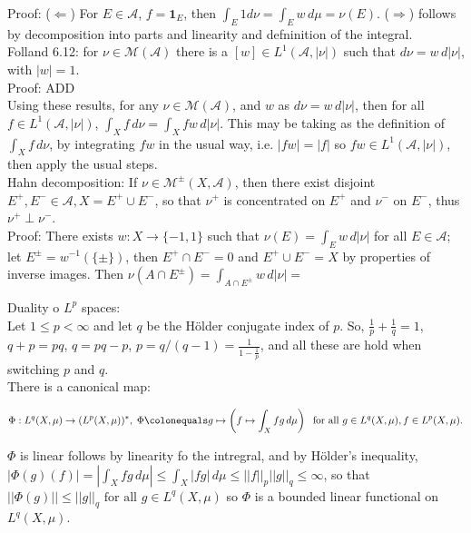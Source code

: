 \documentclass[12pt]{article}
\newcommand{\fall}[0] { \textrm{ for all } }
\newcommand{\A}[0] { \mathcal{A} }
\newcommand{\M}[0] { \mathcal{M} }
\newcommand{\rimply}[0] { \Rightarrow }
\newcommand{\limply}[0] { \Leftarrow }
\newcommand{\rarw}[0] { \rightarrow }
\newcommand{ \defeq }[0] { \colonequals }
\newcommand{ \cf }[1] { \mathbf{1}_{#1} }
\begin{document}
\noindent
Proof: ($\limply$) For $E \in \A$, $f = \cf{E}$, then $\int_E 1 d\nu = \int_E w \, d\mu = \nu(E)$. ($\rimply$) follows by decomposition into parts and linearity and defninition of the integral.   \\

Folland 6.12: for $\nu \in \M(\A)$ there is a $[w] \in L^1(\A, |\nu|)$ such that $d\nu = w \, d|\nu|$, with $|w| = 1$. \\

\noindent
Proof: ADD \\

Using these results, for any $\nu \in \M(\A)$, and $w$ as $d\nu = w \, d|\nu|$, then for all $f \in L^1(\A, |\nu|)$, $\int_X f \, d\nu = \int_X f w \, d|\nu|$. This may be taking as the definition of $\int_X f \, d\nu$, by integrating $f w$ in the usual way, i.e. $|fw| = |f|$ so $fw \in L^1(\A, |\nu|)$, then apply the usual steps. \\


Hahn decomposition: If $\nu \in \M^\pm(X, \A)$, then there exist disjoint $E^+, E^- \in \A, X = E^+ \cup E^-$, so that $\nu^+$ is concentrated on $E^+$ and $\nu^-$ on $E^-$, thus $\nu^+ \perp \nu^-$. \\

Proof: There exists $w: X \rarw \{-1, 1 \}$ such that $\nu(E) = \int_E w \, d|\nu|$ for all $E \in \A$; let $E^\pm = w^{-1}(\{ \pm \})$, then $E^+ \cap E^- = 0$ and $E^+ \cup E^- = X$ by properties of inverse images. Then $\nu(A \cap E^\pm) = \int_{A \cap E^\pm} w \, d|\nu| = $




\break

Duality o $L^p$ spaces: \\

\noindent
Let $1 \le p < \infty$ and let $q$ be the H\"{o}lder conjugate index of $p$. So, $\frac{1}{p} + \frac{1}{q} = 1$, $q+p = pq$, $q = pq-p$, $p=q/(q-1) = \frac{1}{1-{\frac{1}{p}}}$, and all these are hold when switching $p$ and $q$.   \\

\noindent
There is a canonical map:

$$
\Phi: L^q(X, \mu) \rarw  (L^p(X, \mu))^*, \; \Phi \defeq g \mapsto  \left( f \mapsto \int_X fg \, d\mu  \right) \; \fall g \in L^q(X, \mu), f \in L^p(X, \mu).
$$


\noindent
$\Phi$ is linear follows by linearity fo the intregral, and by H\"{o}lder's inequality, $|\Phi(g)(f) | = |\int_X fg \, d\mu| \le \int_X |fg| \, d\mu \le ||f||_p ||g||_q \le \infty$, so that $||\Phi(g)|| \le ||g||_q \fall g \in L^q(X, \mu)$ so $\Phi$ is a bounded linear functional on $L^q(X, \mu)$. \\
\end{document}
